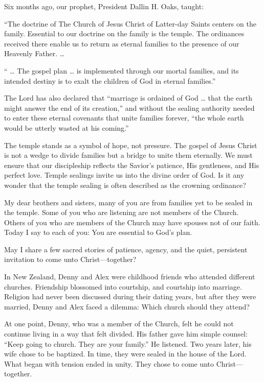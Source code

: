 \documentclass[letterpaper, 11pt]{report}
\begin{document}
Six months ago, our prophet, President Dallin H. Oaks, taught:

“The doctrine of The Church of Jesus Christ of Latter-day Saints centers on the family. Essential to our doctrine on the family is the temple. The ordinances received there enable us to return as eternal families to the presence of our Heavenly Father. …

“ … The gospel plan … is implemented through our mortal families, and its intended destiny is to exalt the children of God in eternal families.”

The Lord has also declared that “marriage is ordained of God … that the earth might answer the end of its creation,” and without the sealing authority needed to enter these eternal covenants that unite families forever, “the whole earth would be utterly wasted at his coming.”

The temple stands as a symbol of hope, not pressure. The gospel of Jesus Christ is not a wedge to divide families but a bridge to unite them eternally. We must ensure that our discipleship reflects the Savior’s patience, His gentleness, and His perfect love. Temple sealings invite us into the divine order of God. Is it any wonder that the temple sealing is often described as the crowning ordinance?

My dear brothers and sisters, many of you are from families yet to be sealed in the temple. Some of you who are listening are not members of the Church. Others of you who are members of the Church may have spouses not of our faith. Today I say to each of you: You are essential to God’s plan.

May I share a few sacred stories of patience, agency, and the quiet, persistent invitation to come unto Christ—together?

In New Zealand, Denny and Alex were childhood friends who attended different churches. Friendship blossomed into courtship, and courtship into marriage. Religion had never been discussed during their dating years, but after they were married, Denny and Alex faced a dilemma: Which church should they attend?

At one point, Denny, who was a member of the Church, felt he could not continue living in a way that felt divided. His father gave him simple counsel: “Keep going to church. They are your family.” He listened. Two years later, his wife chose to be baptized. In time, they were sealed in the house of the Lord. What began with tension ended in unity. They chose to come unto Christ—together.
\end{document}
